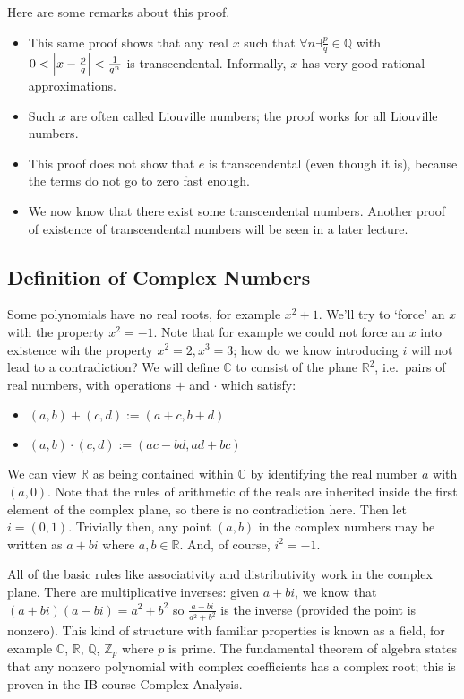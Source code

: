 Here are some remarks about this proof.
\begin{itemize}
	\item This same proof shows that any real \(x\) such that \(\forall n \exists \frac{p}{q}\in \mathbb Q\) with \(0 < \abs{x - \frac{p}{q}} < \frac{1}{q^n}\) is transcendental.
	      Informally, \(x\) has very good rational approximations.
	\item Such \(x\) are often called Liouville numbers; the proof works for all Liouville numbers.
	\item This proof does not show that \(e\) is transcendental (even though it is), because the terms do not go to zero fast enough.
	\item We now know that there exist some transcendental numbers.
	      Another proof of existence of transcendental numbers will be seen in a later lecture.
\end{itemize}

\subsection{Definition of Complex Numbers}
Some polynomials have no real roots, for example \(x^2 + 1\).
We'll try to `force' an \(x\) with the property \(x^2 = -1\).
Note that for example we could not force an \(x\) into existence wih the property \(x^2=2, x^3=3\); how do we know introducing \(i\) will not lead to a contradiction? We will define \(\mathbb C\) to consist of the plane \(\mathbb R^2\), i.e.\ pairs of real numbers, with operations \(+\) and \(\cdot\) which satisfy:
\begin{itemize}
	\item \((a,b)+(c,d) := (a+c, b+d)\)
	\item \((a,b)\cdot(c,d) := (ac-bd, ad+bc)\)
\end{itemize}
We can view \(\mathbb R\) as being contained within \(\mathbb C\) by identifying the real number \(a\) with \((a, 0)\).
Note that the rules of arithmetic of the reals are inherited inside the first element of the complex plane, so there is no contradiction here.
Then let \(i=(0,1)\).
Trivially then, any point \((a, b)\) in the complex numbers may be written as \(a+bi\) where \(a, b \in \mathbb R\).
And, of course, \(i^2 = -1\).

All of the basic rules like associativity and distributivity work in the complex plane.
There are multiplicative inverses: given \(a+bi\), we know that \((a+bi)(a-bi) = a^2 + b^2\) so \(\frac{a-bi}{a^2 + b^2}\) is the inverse (provided the point is nonzero).
This kind of structure with familiar properties is known as a field, for example \(\mathbb C\), \(\mathbb R\), \(\mathbb Q\), \(\mathbb Z_p\) where \(p\) is prime.
The fundamental theorem of algebra states that any nonzero polynomial with complex coefficients has a complex root; this is proven in the IB course Complex Analysis.
